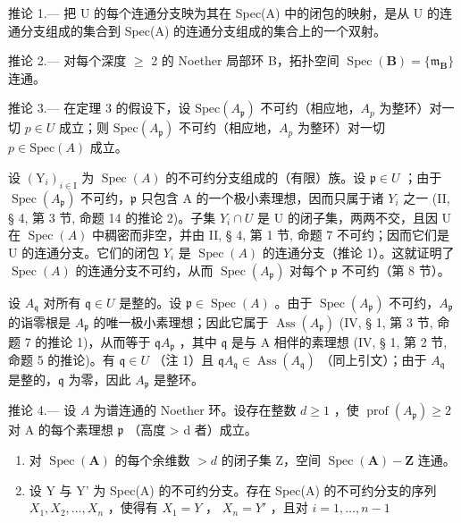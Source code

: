 推论 1.--- 把 U 的每个连通分支映为其在 Spec(A) 中的闭包的映射，是从 U 的连通分支组成的集合到 Spec(A) 的连通分支组成的集合上的一个双射。

推论 2.--- 对每个深度 \(\geqslant\) 2 的 Noether 局部环 B，拓扑空间 \(\operatorname{Spec}(\mathbf{B}) = \{\mathfrak{m}_{\mathbf{B}}\}\) 连通。

推论 3.--- 在定理 3 的假设下，设 \(\text{Spec}(A_{\mathfrak{p}})\) 不可约（相应地，\(A_{p}\) 为整环）对一切 \(p \in U\) 成立；则 \(\text{Spec}(A_{\mathfrak{p}})\) 不可约（相应地，\(A_{p}\) 为整环）对一切 \(p \in \text{Spec}(A)\) 成立。

设 \((\mathrm{Y}_{i})_{i\in\mathrm{I}}\) 为 \(\operatorname{Spec}(A)\) 的不可约分支组成的（有限）族。设 \(\mathfrak{p}\in U\) ；由于 \(\operatorname{Spec}(A_{\mathfrak{p}})\) 不可约，\(\mathfrak{p}\) 只包含 A 的一个极小素理想，因而只属于诸 \(Y_i\) 之一 (II, § 4, 第 3 节, 命题 14 的推论 2)。子集 \(Y_i\cap U\) 是 U 的闭子集，两两不交，且因 U 在 \(\operatorname{Spec}(A)\) 中稠密而非空，并由 II, § 4, 第 1 节, 命题 7 不可约；因而它们是 U 的连通分支。它们的闭包 \(Y_i\) 是 \(\operatorname{Spec}(A)\) 的连通分支（推论 1）。这就证明了 \(\operatorname{Spec}(A)\) 的连通分支不可约，从而 \(\operatorname{Spec}(A_{\mathfrak{p}})\) 对每个 \(\mathfrak{p}\) 不可约（第 8 节）。

设 \(A_{\mathfrak{q}}\) 对所有 \(\mathfrak{q} \in U\) 是整的。设 \(\mathfrak{p} \in \operatorname{Spec}(A)\) 。由于 \(\operatorname{Spec}(A_{\mathfrak{p}})\) 不可约，\(A_{\mathfrak{p}}\) 的诣零根是 \(A_{\mathfrak{p}}\) 的唯一极小素理想；因此它属于 \(\operatorname{Ass}(A_{\mathfrak{p}})\) (IV, § 1, 第 3 节, 命题 7 的推论 1)，从而等于 \(\mathfrak{q}A_{\mathfrak{p}}\) ，其中 \(\mathfrak{q}\) 是与 A 相伴的素理想 (IV, § 1, 第 2 节, 命题 5 的推论)。有 \(\mathfrak{q} \in U\) （注 1）且 \(\mathfrak{q}A_{\mathfrak{q}} \in \operatorname{Ass}(A_{\mathfrak{q}})\) （同上引文）；由于 \(A_{\mathfrak{q}}\) 是整的，\(\mathfrak{q}\) 为零，因此 \(A_{\mathfrak{p}}\) 是整环。

推论 4.--- 设 \(A\) 为谱连通的 Noether 环。设存在整数 \(d \geqslant 1\) ，使 \(\operatorname{prof}(A_{\mathfrak{p}}) \geqslant 2\) 对 A 的每个素理想 \(\mathfrak{p}\) （高度 \textgreater{} d 者）成立。

\begin{enumerate}
\def\labelenumi{\alph{enumi})}
\item
  对 \(\operatorname{Spec}(\mathbf{A})\) 的每个余维数 \(>d\) 的闭子集 Z，空间 \(\operatorname{Spec}(\mathbf{A}) - \mathbf{Z}\) 连通。
\item
  设 Y 与 Y' 为 Spec(A) 的不可约分支。存在 Spec(A) 的不可约分支的序列 \(X_{1}, X_{2}, \ldots, X_{n}\) ，使得有 \(X_{1} = Y\) ， \(X_{n} = Y'\) ，且对 \(i = 1, \ldots, n - 1\)
\end{enumerate}

